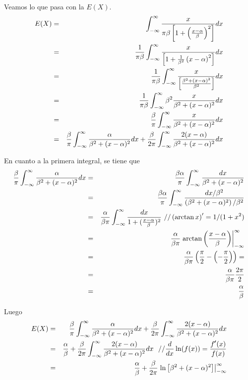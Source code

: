 \begin{i}
Veamos lo que pasa con la $E(X)$.
\begin{eqnarray*}
E(X) &=&\int_{-\infty }^{\infty }\frac{x}{\pi \beta \left[ 1+\left( \frac{%
x-\alpha }{\beta }\right) ^{2}\right] }dx \\
&=&\frac{1}{\pi \beta }\int_{-\infty }^{\infty }\frac{x}{\left[ 1+\frac{1}{%
\beta ^{2}}\left( x-\alpha \right) ^{2}\right] }dx \\
&=&\frac{1}{\pi \beta }\int_{-\infty }^{\infty }\frac{x}{\left[ \frac{\beta
^{2}+\left( x-\alpha \right) ^{2}}{\beta ^{2}}\right] }dx \\
&=&\frac{1}{\pi \beta }\int_{-\infty }^{\infty }\beta ^{2}\frac{x}{\beta
^{2}+(x-\alpha )^{2}}dx \\
&=&\frac{\beta }{\pi }\int_{-\infty }^{\infty }\frac{x}{\beta ^{2}+(x-\alpha
)^{2}}dx \\
&=&\frac{\beta }{\pi }\int_{-\infty }^{\infty }\frac{\alpha }{\beta
^{2}+(x-\alpha )^{2}}dx+\frac{\beta }{2\pi }\int_{-\infty }^{\infty }\frac{%
2(x-\alpha )}{\beta ^{2}+(x-\alpha )^{2}}dx
\end{eqnarray*}


En cuanto a la primera integral, se tiene que
\begin{eqnarray*}
\frac{\beta }{\pi }\int_{-\infty }^{\infty }\frac{\alpha }{\beta
^{2}+(x-\alpha )^{2}}dx &=&\frac{\beta \alpha }{\pi }\int_{-\infty }^{\infty
}\frac{dx}{\beta ^{2}+(x-\alpha )^{2}} \\
&=&\frac{\beta \alpha }{\pi }\int_{-\infty }^{\infty }\frac{dx/\beta ^{2}}{%
\left( \beta ^{2}+(x-\alpha )^{2}\right) /\beta ^{2}} \\
&=&\frac{\alpha }{\beta \pi }\int_{-\infty }^{\infty }\frac{dx}{1+(\frac{%
x-\alpha }{\beta })^{2}}\text{ //}\left( \arctan x\right) ^{\prime
}=1/(1+x^{2}) \\
&=&\frac{\alpha }{\beta \pi }\left. \arctan \left( \frac{x-\alpha }{\beta }%
\right) \right\vert _{-\infty }^{\infty } \\
&=&\frac{\alpha }{\beta \pi }\left( \frac{\pi }{2}-\left( -\frac{\pi }{2}%
\right) \right) = \\
&=&\frac{\alpha }{\beta \pi }\frac{2\pi }{2} \\
&=&\frac{\alpha }{\beta }
\end{eqnarray*}

Luego
\begin{eqnarray*}
E(X) &=&\frac{\beta }{\pi }\int_{-\infty }^{\infty }\frac{\alpha }{\beta
^{2}+(x-\alpha )^{2}}dx+\frac{\beta }{2\pi }\int_{-\infty }^{\infty }\frac{%
2(x-\alpha )}{\beta ^{2}+(x-\alpha )^{2}}dx \\
&=&\frac{\alpha }{\beta }+\frac{\beta }{2\pi }\int_{-\infty }^{\infty }\frac{%
2(x-\alpha )}{\beta ^{2}+(x-\alpha )^{2}}dx\text{ \ //}\frac{d}{dx}\ln
(f(x))=\frac{f{\acute{}}^{\prime }(x)}{f(x)} \\
&=&\frac{\alpha }{\beta }+\frac{\beta }{2\pi }\left. \ln \left[ \beta
^{2}+(x-\alpha )^{2}\right] \right\vert _{-\infty }^{\infty }
\end{eqnarray*}


\end{i}
